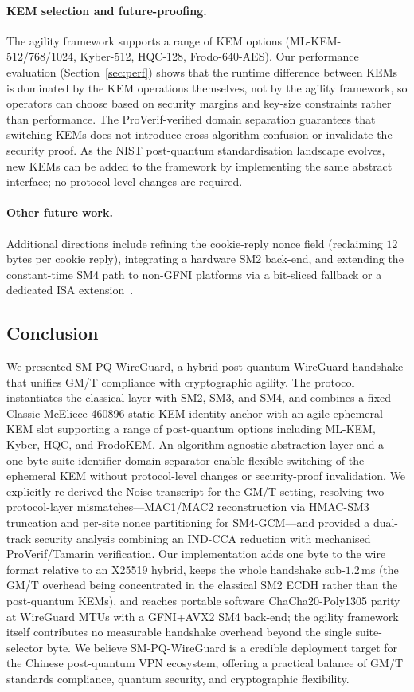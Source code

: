 \documentclass{SCIS2026}
\begin{document}
\paragraph{KEM selection and future-proofing.}
The agility framework supports a range of KEM options
(ML-KEM-512/768/1024, Kyber-512, HQC-128, Frodo-640-AES).  Our
performance evaluation (Section~\ref{sec:perf}) shows that the runtime
difference between KEMs is dominated by the KEM operations themselves,
not by the agility framework, so operators can choose based on security
margins and key-size constraints rather than performance.  The
ProVerif-verified domain separation guarantees that switching KEMs does
not introduce cross-algorithm confusion or invalidate the security
proof.  As the NIST post-quantum standardisation landscape evolves, new
KEMs can be added to the framework by implementing the same abstract
interface; no protocol-level changes are required.

\paragraph{Other future work.}
Additional directions include refining the cookie-reply nonce field
(reclaiming $12$ bytes per cookie reply), integrating a hardware SM2
back-end, and extending the constant-time SM4 path to non-GFNI
platforms via a bit-sliced fallback or a dedicated ISA
extension~\cite{46}.

\subsection{Conclusion}

We presented SM-PQ-WireGuard, a hybrid post-quantum WireGuard handshake
that unifies GM/T compliance with cryptographic agility.  The protocol
instantiates the classical layer with SM2, SM3, and SM4, and
combines a fixed Classic-McEliece-460896 static-KEM identity anchor
with an agile ephemeral-KEM slot supporting a range of post-quantum
options including ML-KEM, Kyber, HQC, and FrodoKEM.  An
algorithm-agnostic abstraction
layer and a one-byte suite-identifier domain separator enable flexible
switching of the ephemeral KEM without protocol-level changes or
security-proof invalidation.  We explicitly re-derived the Noise transcript for the
GM/T setting, resolving two protocol-layer mismatches---MAC1/MAC2
reconstruction via HMAC-SM3 truncation and per-site nonce partitioning
for SM4-GCM---and provided a dual-track security analysis combining an
IND-CCA reduction with mechanised ProVerif/Tamarin verification.  Our
implementation adds one byte to the wire format relative to an X25519
hybrid, keeps the whole handshake sub-$1.2$\,ms (the GM/T overhead being
concentrated in the
classical SM2 ECDH rather than the post-quantum KEMs), and reaches
portable software ChaCha20-Poly1305 parity at WireGuard MTUs with a GFNI+AVX2 SM4
back-end; the agility framework itself contributes no measurable
handshake overhead beyond the single suite-selector byte.  We believe SM-PQ-WireGuard is a credible deployment target
for the Chinese post-quantum VPN ecosystem, offering a practical
balance of GM/T standards compliance, quantum security, and cryptographic
flexibility.
\end{document}
